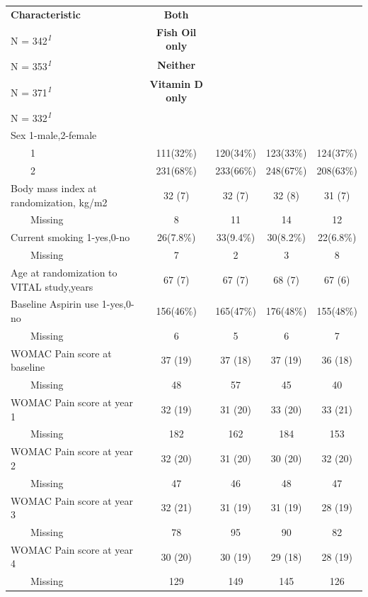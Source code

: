 \documentclass{article}
\begin{document}
\begin{table}[!t]
\fontsize{12.0pt}{14.4pt}\selectfont
\begin{tabular*}{\linewidth}{@{\extracolsep{\fill}}lcccc}
\toprule
\textbf{Characteristic} & \textbf{Both}\\
N = 342\textsuperscript{\textit{1}} & \textbf{Fish Oil only}\\
N = 353\textsuperscript{\textit{1}} & \textbf{Neither}\\
N = 371\textsuperscript{\textit{1}} & \textbf{Vitamin D only}\\
N = 332\textsuperscript{\textit{1}} \\ 
\midrule\addlinespace[2.5pt]
Sex 1-male,2-female &  &  &  &  \\ 
    1 & 111(32\%) & 120(34\%) & 123(33\%) & 124(37\%) \\ 
    2 & 231(68\%) & 233(66\%) & 248(67\%) & 208(63\%) \\ 
Body mass index at randomization, kg/m2 & 32 (7) & 32 (7) & 32 (8) & 31 (7) \\ 
    Missing & 8 & 11 & 14 & 12 \\ 
Current smoking 1-yes,0-no & 26(7.8\%) & 33(9.4\%) & 30(8.2\%) & 22(6.8\%) \\ 
    Missing & 7 & 2 & 3 & 8 \\ 
Age at randomization to VITAL study,years & 67 (7) & 67 (7) & 68 (7) & 67 (6) \\ 
Baseline Aspirin use 1-yes,0-no & 156(46\%) & 165(47\%) & 176(48\%) & 155(48\%) \\ 
    Missing & 6 & 5 & 6 & 7 \\ 
WOMAC Pain score at baseline & 37 (19) & 37 (18) & 37 (19) & 36 (18) \\ 
    Missing & 48 & 57 & 45 & 40 \\ 
WOMAC Pain score at year 1 & 32 (19) & 31 (20) & 33 (20) & 33 (21) \\ 
    Missing & 182 & 162 & 184 & 153 \\ 
WOMAC Pain score at year 2 & 32 (20) & 31 (20) & 30 (20) & 32 (20) \\ 
    Missing & 47 & 46 & 48 & 47 \\ 
WOMAC Pain score at year 3 & 32 (21) & 31 (19) & 31 (19) & 28 (19) \\ 
    Missing & 78 & 95 & 90 & 82 \\ 
WOMAC Pain score at year 4 & 30 (20) & 30 (19) & 29 (18) & 28 (19) \\ 
    Missing & 129 & 149 & 145 & 126 \\ 

\end{tabular*}
\end{table}
\end{document}
